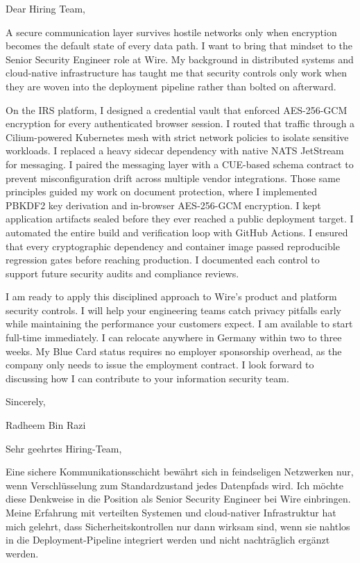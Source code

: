 \documentclass[11pt,a4paper]{coverletter}
\begin{document}

\opening{Dear Hiring Team,}

A secure communication layer survives hostile networks only when encryption becomes the default state of every data path. I want to bring that mindset to the Senior Security Engineer role at Wire. My background in distributed systems and cloud-native infrastructure has taught me that security controls only work when they are woven into the deployment pipeline rather than bolted on afterward.

On the IRS platform, I designed a credential vault that enforced AES-256-GCM encryption for every authenticated browser session. I routed that traffic through a Cilium-powered Kubernetes mesh with strict network policies to isolate sensitive workloads. I replaced a heavy sidecar dependency with native NATS JetStream for messaging. I paired the messaging layer with a CUE-based schema contract to prevent misconfiguration drift across multiple vendor integrations. Those same principles guided my work on document protection, where I implemented PBKDF2 key derivation and in-browser AES-256-GCM encryption. I kept application artifacts sealed before they ever reached a public deployment target. I automated the entire build and verification loop with GitHub Actions. I ensured that every cryptographic dependency and container image passed reproducible regression gates before reaching production. I documented each control to support future security audits and compliance reviews.

I am ready to apply this disciplined approach to Wire’s product and platform security controls. I will help your engineering teams catch privacy pitfalls early while maintaining the performance your customers expect. I am available to start full-time immediately. I can relocate anywhere in Germany within two to three weeks. My Blue Card status requires no employer sponsorship overhead, as the company only needs to issue the employment contract. I look forward to discussing how I can contribute to your information security team.

\closing{Sincerely,}{Radheem Bin Razi}

\clearpage
{}


\opening{Sehr geehrtes Hiring-Team,}

Eine sichere Kommunikationsschicht bewährt sich in feindseligen Netzwerken nur, wenn Verschlüsselung zum Standardzustand jedes Datenpfads wird. Ich möchte diese Denkweise in die Position als Senior Security Engineer bei Wire einbringen. Meine Erfahrung mit verteilten Systemen und cloud-nativer Infrastruktur hat mich gelehrt, dass Sicherheitskontrollen nur dann wirksam sind, wenn sie nahtlos in die Deployment-Pipeline integriert werden und nicht nachträglich ergänzt werden.
\end{document}
